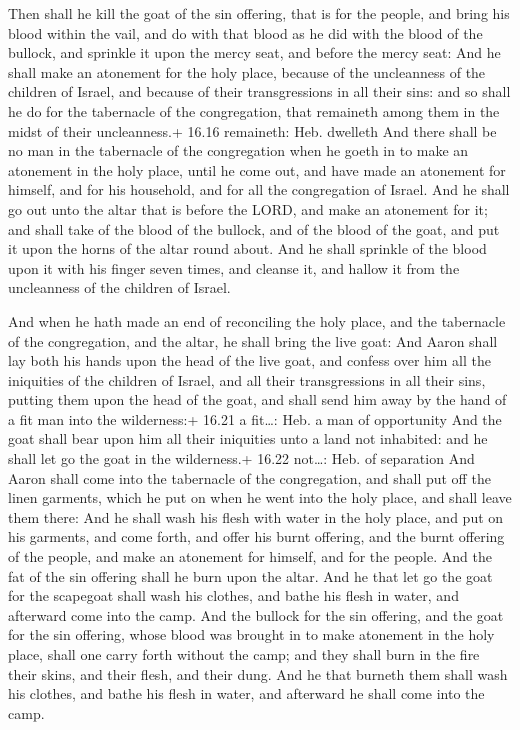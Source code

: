  Then shall he kill the goat of the sin offering, that is
for the people, and bring his blood within the vail, and do with that
blood as he did with the blood of the bullock, and sprinkle it upon the
mercy seat, and before the mercy seat:  And he shall make
an atonement for the holy place, because of the uncleanness of the
children of Israel, and because of their transgressions in all their
sins: and so shall he do for the tabernacle of the congregation, that
remaineth among them in the midst of their uncleanness.+ 16.16
remaineth: Heb. dwelleth  And there shall be no man in the
tabernacle of the congregation when he goeth in to make an atonement in
the holy place, until he come out, and have made an atonement for
himself, and for his household, and for all the congregation of Israel.
 And he shall go out unto the altar that is before the
LORD, and make an atonement for it; and shall take of the blood of the
bullock, and of the blood of the goat, and put it upon the horns of the
altar round about.  And he shall sprinkle of the blood upon
it with his finger seven times, and cleanse it, and hallow it from the
uncleanness of the children of Israel.

 And when he hath made an end of reconciling the holy
place, and the tabernacle of the congregation, and the altar, he shall
bring the live goat:  And Aaron shall lay both his hands
upon the head of the live goat, and confess over him all the iniquities
of the children of Israel, and all their transgressions in all their
sins, putting them upon the head of the goat, and shall send him away by
the hand of a fit man into the wilderness:+ 16.21 a fit\ldots: Heb. a
man of opportunity  And the goat shall bear upon him all
their iniquities unto a land not inhabited: and he shall let go the goat
in the wilderness.+ 16.22 not\ldots: Heb. of separation 
And Aaron shall come into the tabernacle of the congregation, and shall
put off the linen garments, which he put on when he went into the holy
place, and shall leave them there:  And he shall wash his
flesh with water in the holy place, and put on his garments, and come
forth, and offer his burnt offering, and the burnt offering of the
people, and make an atonement for himself, and for the people.
 And the fat of the sin offering shall he burn upon the
altar.  And he that let go the goat for the scapegoat shall
wash his clothes, and bathe his flesh in water, and afterward come into
the camp.  And the bullock for the sin offering, and the
goat for the sin offering, whose blood was brought in to make atonement
in the holy place, shall one carry forth without the camp; and they
shall burn in the fire their skins, and their flesh, and their dung.
 And he that burneth them shall wash his clothes, and bathe
his flesh in water, and afterward he shall come into the camp.

